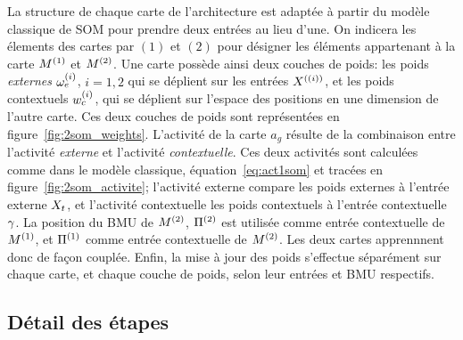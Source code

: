 La structure de chaque carte de l'architecture est adaptée à partir du modèle classique de SOM pour prendre deux entrées au lieu d'une. On indicera les élements des cartes par $(1)$ et $(2)$ pour désigner les éléments appartenant à la carte $M^{({1})}$ et $M^{({2})}$.
Une carte possède ainsi deux couches de poids: les poids \emph{externes} $\omega_e^{({i})}$, $i=1,2$ qui se déplient sur les entrées $X^{({(i)})}$, et les poids contextuels $w_c^{({i})}$, qui se déplient sur l'espace des positions en une dimension de l'autre carte. Ces deux couches de poids sont représentées en figure~\ref{fig:2som_weights}.
L'activité de la carte $a_g$ résulte de la combinaison entre l'activité \emph{externe} et l'activité \emph{contextuelle}. Ces deux activités sont calculées comme dans le modèle classique, équation~\ref{eq:act1som} et tracées en figure~\ref{fig:2som_activite}; l'activité externe compare les poids externes à l'entrée externe $X_t$, et l'activité contextuelle les poids contextuels à l'entrée contextuelle $\gamma$. 
La position du BMU de $M^{({2})}$, $\Pi^{({2})}$ est utilisée comme entrée contextuelle de $M^{({1})}$, et $\Pi^{({1})}$ comme entrée contextuelle de $M^{({2})}$. Les deux cartes apprennnent donc de façon couplée. Enfin, la mise à jour des poids s'effectue séparément sur chaque carte, et chaque couche de poids, selon leur entrées et BMU respectifs.

\subsection{Détail des étapes}
